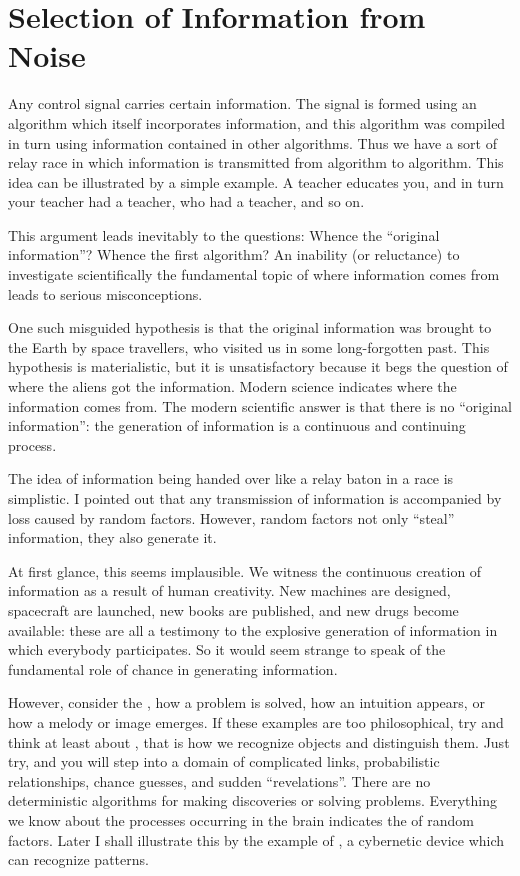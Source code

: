 
\section{Selection of Information from Noise}

 Any control signal carries certain information. The signal is formed
using an algorithm which itself incorporates information, and this
algorithm was compiled in turn using information contained in other
algorithms. Thus we have a sort of relay race in which information is
transmitted from algorithm to algorithm. This idea can be illustrated by
a simple example. A teacher educates you, and in turn your teacher had
a teacher, who had a teacher, and so on.

This argument leads inevitably to the questions: Whence the ``original
information''? Whence the first algorithm? An inability (or reluctance)
to investigate scientifically the fundamental topic of where information
comes from leads to serious misconceptions.

One such misguided hypothesis is that the original information was
brought to the Earth by space travellers, who visited us in some
long-forgotten past. This hypothesis is materialistic, but it is unsatisfactory
because it begs the question of where the aliens got the
information. Modern science indicates where the information comes
from. The modern scientific answer is that there is no ``original
information'': the generation of information is a continuous and
continuing process.

 The idea of information being handed
over like a relay baton in a race is simplistic. I pointed out that any
transmission of information is accompanied by loss caused by random
factors. However, random factors not only ``steal'' information, they also
generate it.

At first glance, this seems implausible. We witness the continuous
creation of information as a result of human creativity. New machines
are designed, spacecraft are launched, new books are published, and new
drugs become available: these are all a testimony to the explosive
generation of information in which everybody participates. So it would
seem strange to speak of the fundamental role of chance in generating
information.

However, consider the , how a problem is solved,
how an intuition appears, or how a melody or image emerges. If these
examples are too philosophical, try and think at least about , that is how we recognize objects and distinguish them. Just
try, and you will step into a domain of complicated links, probabilistic
relationships, chance guesses, and sudden ``revelations''. There are no
deterministic algorithms for making discoveries or solving problems.
Everything we know about the processes occurring in the brain indicates
the  of random factors. Later I shall illustrate this by the example of , a cybernetic device which can recognize patterns.

